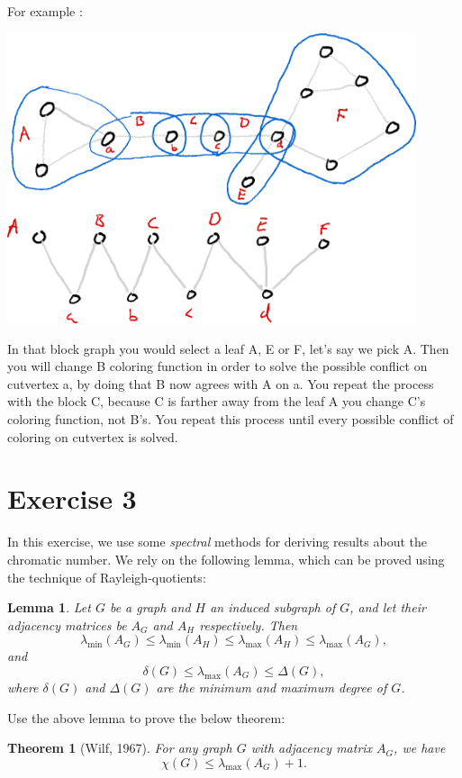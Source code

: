 \documentclass{article}
\newtheorem{lemma}{Lemma}
\newtheorem{theorem}{Theorem}
\begin{document}
For example :

      
      \includegraphics[width=0.9\textwidth]{graph_with_blockgraph.png}


In that block graph you would select a leaf A, E or F, let's say we pick A. Then you will change B coloring function in order to solve the possible conflict on cutvertex a, by doing that B now agrees with A on a. You repeat the process with the block C, because C is farther away from the leaf A you change C's coloring function, not B's. You repeat this process until every possible conflict of coloring on cutvertex is solved. 



\section*{Exercise 3}
 In this exercise, we use some \emph{spectral} methods for deriving results about the chromatic number. We rely on the following lemma, which can be proved using the technique of Rayleigh-quotients:

  \begin{lemma}
    Let $G$ be a graph and $H$ an induced subgraph of $G$, and let their adjacency matrices be $A_G$ and $A_H$ respectively. Then
    $$\lambda_{\min}\left(A_G\right) \leq \lambda_{\min}\left(A_H\right) \leq \lambda_{\max}\left(A_H\right) \leq \lambda_{\max}\left(A_G\right),$$
    and
    $$\delta(G) \leq \lambda_{\max}\left(A_G\right) \leq \Delta(G),$$
    where $\delta(G)$ and $\Delta(G)$ are the minimum and maximum degree of $G$.
  \end{lemma}

  Use the above lemma to prove the below theorem:
  \begin{theorem}[Wilf, 1967]
    For any graph $G$ with adjacency matrix $A_G$, we have
    $$\chi(G) \leq \lambda_{\max}\left(A_G\right) + 1.$$
  \end{theorem}
\end{document}
